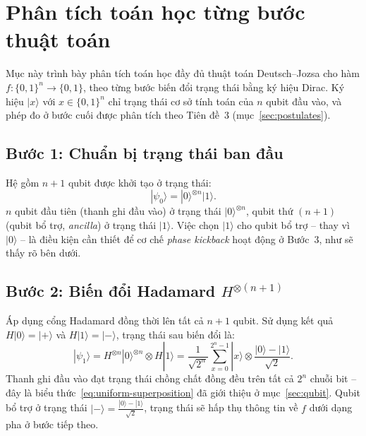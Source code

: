 \section{Phân tích toán học từng bước thuật toán}
Mục này trình bày phân tích toán học đầy đủ thuật toán Deutsch--Jozsa cho hàm
$f:\{0,1\}^n \to \{0,1\}$, theo từng bước biến đổi trạng thái bằng ký hiệu
Dirac. Ký hiệu $|x\rangle$ với $x \in \{0,1\}^n$ chỉ trạng thái cơ sở tính
toán của $n$ qubit đầu vào, và phép đo ở bước cuối được phân tích theo Tiên
đề~3 (mục~\ref{sec:postulates}).
 
\subsection*{Bước 1: Chuẩn bị trạng thái ban đầu}
 
Hệ gồm $n+1$ qubit được khởi tạo ở trạng thái:
\begin{equation}
    |\psi_0\rangle = |0\rangle^{\otimes n}|1\rangle.
    \label{eq:dj-init}
\end{equation}
$n$ qubit đầu tiên (thanh ghi đầu vào) ở trạng thái $|0\rangle^{\otimes n}$,
qubit thứ $(n+1)$ (qubit bổ trợ, \textit{ancilla}) ở trạng thái $|1\rangle$.
Việc chọn $|1\rangle$ cho qubit bổ trợ -- thay vì $|0\rangle$ -- là điều kiện
cần thiết để cơ chế \textit{phase kickback} hoạt động ở Bước~3, như sẽ thấy
rõ bên dưới.
 
\subsection*{Bước 2: Biến đổi Hadamard $H^{\otimes(n+1)}$}
 
Áp dụng cổng Hadamard đồng thời lên tất cả $n+1$ qubit. Sử dụng kết quả
$H|0\rangle = |{+}\rangle$ và $H|1\rangle = |{-}\rangle$,
trạng thái sau biến đổi là:
\begin{equation}
    |\psi_1\rangle
    = H^{\otimes n}|0\rangle^{\otimes n} \otimes H|1\rangle
    = \frac{1}{\sqrt{2^n}}\sum_{x=0}^{2^n-1}|x\rangle
      \otimes \frac{|0\rangle - |1\rangle}{\sqrt{2}}.
    \label{eq:dj-hadamard1}
\end{equation}
Thanh ghi đầu vào đạt trạng thái chồng chất đồng đều trên tất cả $2^n$ chuỗi
bit -- đây là biểu thức~\eqref{eq:uniform-superposition} đã giới thiệu ở
mục~\ref{sec:qubit}. Qubit bổ trợ ở trạng thái $|{-}\rangle =
\frac{|0\rangle-|1\rangle}{\sqrt{2}}$, trạng thái sẽ hấp thụ thông tin về
$f$ dưới dạng pha ở bước tiếp theo.
 
